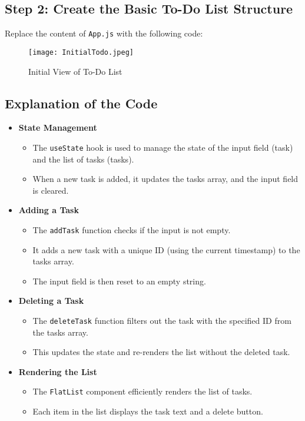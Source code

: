 \documentclass{article}
\begin{document}
\subsection{Step 2: Create the Basic To-Do List Structure}
Replace the content of \texttt{App.js} with the following code:
\begin{figure}[H]
    \centering
    \texttt{[image: InitialTodo.jpeg]}
    \caption{Initial View of To-Do List}
\end{figure}


\subsection{Explanation of the Code}
\begin{itemize}
    \item \textbf{State Management}
    \begin{itemize}
        \item The \texttt{useState} hook is used to manage the state of the input field (task) and the list of tasks (tasks).
        \item When a new task is added, it updates the tasks array, and the input field is cleared.
    \end{itemize}
    
    \item \textbf{Adding a Task}
    \begin{itemize}
        \item The \texttt{addTask} function checks if the input is not empty.
        \item It adds a new task with a unique ID (using the current timestamp) to the tasks array.
        \item The input field is then reset to an empty string.
    \end{itemize}
    
    \item \textbf{Deleting a Task}
    \begin{itemize}
        \item The \texttt{deleteTask} function filters out the task with the specified ID from the tasks array.
        \item This updates the state and re-renders the list without the deleted task.
    \end{itemize}
    
    \item \textbf{Rendering the List}
    \begin{itemize}
        \item The \texttt{FlatList} component efficiently renders the list of tasks.
        \item Each item in the list displays the task text and a delete button.
    \end{itemize}
\end{itemize}
\end{document}

